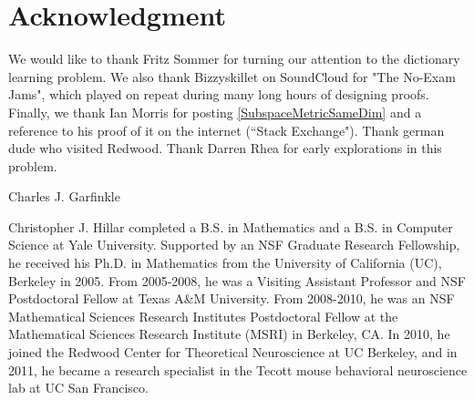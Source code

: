 \documentclass[journal, onecolumn]{IEEEtran}
\begin{document}

\section*{Acknowledgment}
We would like to thank Fritz Sommer for turning our attention to the dictionary learning problem. We also thank Bizzyskillet on SoundCloud for "The No-Exam Jams", which played on repeat during many long hours of designing proofs. Finally, we thank Ian Morris for posting \eqref{SubspaceMetricSameDim} and a reference to his proof of it on the internet (``Stack Exchange").
Thank german dude who visited Redwood.  Thank Darren Rhea for early explorations in this problem.






\begin{IEEEbiographynophoto}{Charles J. Garfinkle}
\end{IEEEbiographynophoto}

\begin{IEEEbiographynophoto}{Christopher J. Hillar}
completed a B.S. in Mathematics and a B.S. in Computer Science at Yale University.  Supported by an NSF Graduate Research Fellowship, he received his Ph.D. in Mathematics from the University of California (UC), Berkeley in 2005. From 2005-2008, he was a Visiting Assistant Professor and NSF Postdoctoral Fellow at Texas A\&M University. From 2008-2010, he was an NSF Mathematical Sciences Research Institutes Postdoctoral Fellow at the Mathematical Sciences Research Institute (MSRI) in Berkeley, CA.  In 2010, he joined the Redwood Center for Theoretical Neuroscience at UC Berkeley, and in 2011, he  became a research specialist in the Tecott mouse behavioral neuroscience lab at UC San Francisco.
\end{IEEEbiographynophoto}

\end{document}
